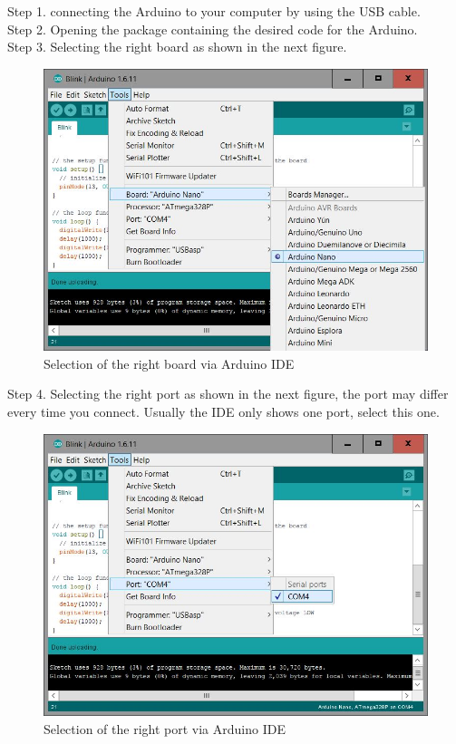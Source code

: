 \documentclass{report}
\begin{document}
Step 1. connecting the Arduino to your computer by using the USB cable. \\
Step 2. Opening the package containing the desired code for the Arduino. \\
Step 3. Selecting the right board as shown in the next figure. \\
\begin{figure}[H]
	\centering
\includegraphics[width=1\textwidth]{images/Select-board.JPG} 
	\caption{Selection of the right board via Arduino IDE}
\end{figure}
\newpage
Step 4. Selecting the right port as shown in the next figure, the port may differ every time you connect. Usually the IDE only shows one port, select this one. \\
\begin{figure}[H]
	\centering
\includegraphics[width=1\textwidth]{images/Select-port.JPG} 
	\caption{Selection of the right port via Arduino IDE}
\end{figure}
\end{document}
